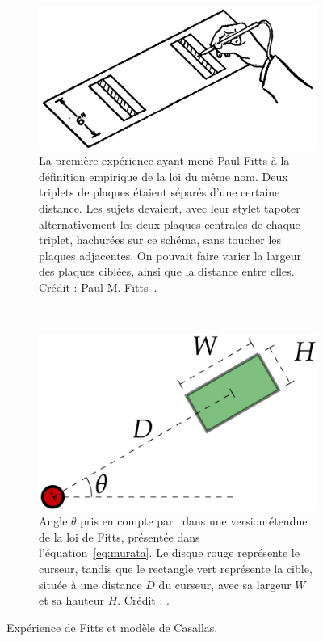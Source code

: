 	\begin{figure}[!htbp]
		\begin{subfigure}[t]{0.58\textwidth}
			\centering
			\includegraphics[width=\textwidth]{figures/ch2/fitts}
			\caption{La première expérience ayant mené Paul Fitts à la  définition empirique de la loi du même nom. Deux triplets de plaques étaient séparés d'une certaine distance. Les sujets devaient, avec leur stylet \og tapoter \fg{} alternativement les deux plaques centrales de chaque triplet, hachurées sur ce schéma, sans toucher les plaques adjacentes. On pouvait faire varier la largeur des plaques ciblées, ainsi que la distance entre elles. Crédit : Paul M. Fitts~\cite{fitts1954information}.}
			\label{fig:fitts}
		\end{subfigure}
		~
		\begin{subfigure}[t]{0.40\textwidth}
			\centering
			\includegraphics[width=\textwidth]{figures/ch2/theta}
			\caption{Angle $\theta$ pris en compte par~\cite{murata2001extending} dans une version étendue de la loi de Fitts, présentée dans l'équation~\ref{eq:murata}. Le disque rouge représente le curseur, tandis que le rectangle vert représente la cible, située à une distance $D$ du curseur, avec sa largeur $W$ et sa hauteur $H$. Crédit : \cite{casallas2015prediction}.}
			\label{fig:theta}
		\end{subfigure}
		\caption{Expérience de Fitts et modèle de Casallas.}
		\label{fig:fittstheta}
	\end{figure}
	

